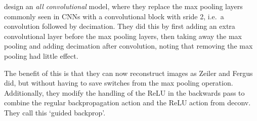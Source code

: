   \cite{springenberg_striving_2014-3} design an \emph{all convolutional} model,
  where they replace the max pooling layers commonly seen in CNNs with a
  convolutional block with sride 2, i.e.\ a convolution followed by decimation.
  They did this by first adding an extra convolutional layer before the max
  pooling layers, then taking away the max pooling and adding decimation after
  convolution, noting that removing the max pooling had little effect. 

  The benefit of this is that they can now reconstruct images as Zeiler and
  Fergus did, but without having to save switches from the max pooling
  operation. Additionally, they modify the handling of the ReLU in the 
  backwards pass to combine the regular backpropagation action and the ReLU
  action from deconv. They call this `guided backprop'.
  
